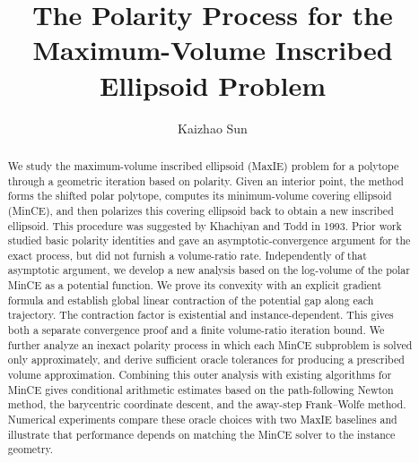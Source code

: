 \documentclass[smallextended]{svjour3}
\begin{document}
\title{The Polarity Process for the Maximum-Volume Inscribed Ellipsoid Problem}
\author{Kaizhao Sun}


\date{}
\maketitle

\begin{abstract}
We study the maximum-volume inscribed ellipsoid (MaxIE) problem for a polytope
through a geometric iteration based on polarity. Given an interior point, the
method forms the shifted polar polytope, computes its minimum-volume covering
ellipsoid (MinCE), and then polarizes this covering ellipsoid back to obtain a
new inscribed ellipsoid. This procedure was suggested by Khachiyan and Todd in
1993. 
Prior work studied basic polarity identities and gave an asymptotic-convergence
argument for the exact process, but did not furnish a
volume-ratio rate.
Independently of that asymptotic argument, we develop
a new analysis based on the log-volume of the polar MinCE as a
potential function. We prove its convexity with an explicit gradient formula
and establish global linear contraction of the potential gap along each
trajectory. The contraction factor is existential and
instance-dependent. 
This gives both a separate convergence proof and a finite volume-ratio iteration
bound. We further analyze an inexact polarity process in which each MinCE subproblem is solved
only approximately, and derive sufficient oracle tolerances for producing a
prescribed volume approximation. Combining this outer analysis with existing
algorithms for MinCE gives conditional arithmetic estimates based on the path-following Newton method,
the barycentric coordinate descent, and the away-step
Frank--Wolfe method. 
Numerical experiments compare these
oracle choices with two MaxIE baselines and illustrate that performance depends
on matching the MinCE solver to the instance geometry.
\end{abstract}

\addtolength{\abovedisplayskip}{-0.6pt}
\addtolength{\belowdisplayskip}{-0.6pt}
\addtolength{\belowdisplayshortskip}{-0.4pt}
\setlength{\jot}{2.5pt}
\end{document}

